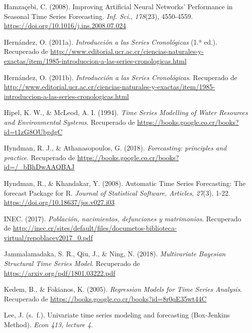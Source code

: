 \documentclass[
]{article}
\newlength{\cslhangindent}
\newenvironment{cslreferences}%
  {\setlength{\parindent}{0pt}%
  \everypar{\setlength{\hangindent}{\cslhangindent}}\ignorespaces}%
  {\par}
\begin{document}
\begin{cslreferences}
\leavevmode\hypertarget{ref-Hamzacebi}{}%
Hamzaçebi, C. (2008). Improving Artificial Neural Networks' Performance
in Seasonal Time Series Forecasting. \emph{Inf. Sci.}, \emph{178}(23),
4550-4559. \url{https://doi.org/10.1016/j.ins.2008.07.024}

\leavevmode\hypertarget{ref-oscarh-1}{}%
Hernández, O. (2011a). \emph{Introducción a las Series Cronológicas}
(1.ª ed.). Recuperado de
\url{http://www.editorial.ucr.ac.cr/ciencias-naturales-y-exactas/item/1985-introduccion-a-las-series-cronologicas.html}

\leavevmode\hypertarget{ref-oscarh-4}{}%
Hernández, O. (2011b). \emph{Introducción a las Series Cronológicas}.
Recuperado de
\url{http://www.editorial.ucr.ac.cr/ciencias-naturales-y-exactas/item/1985-introduccion-a-las-series-cronologicas.html}

\leavevmode\hypertarget{ref-Hipel}{}%
Hipel, K. W., \& McLeod, A. I. (1994). \emph{Time Series Modelling of
Water Resources and Environmental Systems}. Recuperado de
\url{https://books.google.co.cr/books?id=t1zG8OUbgdgC}

\leavevmode\hypertarget{ref-hyndman2018forecasting}{}%
Hyndman, R. J., \& Athanasopoulos, G. (2018). \emph{Forecasting:
principles and practice}. Recuperado de
\url{https://books.google.co.cr/books?id=/_bBhDwAAQBAJ}

\leavevmode\hypertarget{ref-auto.arima}{}%
Hyndman, R., \& Khandakar, Y. (2008). Automatic Time Series Forecasting:
The forecast Package for R. \emph{Journal of Statistical Software,
Articles}, \emph{27}(3), 1-22.
\url{https://doi.org/10.18637/jss.v027.i03}

\leavevmode\hypertarget{ref-calidad_vitales}{}%
INEC. (2017). \emph{Población, nacimientos, defunciones y matrimonios}.
Recuperado de
\url{http://inec.cr/sites/default/files/documetos-biblioteca-virtual/repoblacev2017_0.pdf}

\leavevmode\hypertarget{ref-bayes}{}%
Jammalamadaka, S. R., Qiu, J., \& Ning, N. (2018). \emph{Multivariate
Bayesian Structural Time Series Model}. Recuperado de
\url{https://arxiv.org/pdf/1801.03222.pdf}

\leavevmode\hypertarget{ref-kedem}{}%
Kedem, B., \& Fokianos, K. (2005). \emph{Regression Models for Time
Series Analysis}. Recuperado de
\url{https://books.google.co.cr/books?id=8r0qE35wt44C}

\leavevmode\hypertarget{ref-Lee}{}%
Lee, J. (s.~f.). Univariate time series modeling and forecasting
(Box-Jenkins Method). \emph{Econ 413, lecture 4}.


\end{cslreferences}
\end{document}
